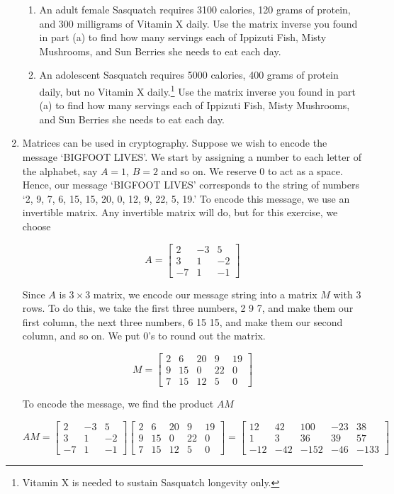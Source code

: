\documentclass{ximera}
\begin{document}
\begin{enumerate}
\begin{enumerate}
\item  An adult female Sasquatch requires 3100 calories, 120 grams of protein, and 300 milligrams of Vitamin X daily. Use the matrix inverse you found in part (a) to find how many servings each of Ippizuti Fish, Misty Mushrooms, and Sun Berries she needs to eat each day.

\item  An adolescent Sasquatch requires 5000 calories, 400 grams of protein daily, but no Vitamin X daily.\footnote{Vitamin X is needed to sustain Sasquatch longevity only.}   Use the matrix inverse you found in part (a) to find how many servings each of Ippizuti Fish, Misty Mushrooms, and Sun Berries she needs to eat each day.

\end{enumerate}


\item Matrices can be used in cryptography.  Suppose we wish to encode the message `BIGFOOT LIVES'.  We start by assigning a number to each letter of the alphabet, say $A=1$, $B=2$ and so on.  We reserve $0$ to act as a space.  Hence, our message `BIGFOOT LIVES' corresponds to the string of numbers `2, 9, 7, 6, 15, 15, 20, 0, 12, 9, 22, 5, 19.' To encode this message, we use an invertible matrix.  Any invertible matrix will do, but for this exercise, we choose

\[ A = \left[ \begin{array}{rrr} 2 & -3 & 5 \\ 3 & 1 &-2 \\ -7 & 1 & -1 \end{array} \right] \]

Since $A$ is  $3 \times 3$ matrix, we encode our message string into a matrix $M$ with $3$ rows.  To do this, we take the first three numbers, 2 9 7, and make them our first column, the next three numbers, 6 15 15, and make them our second column, and so on.  We put $0$'s to round out the matrix.


\[ M = \left[  \begin{array}{rrrrr} 2 & 6 & 20 & 9 & 19 \\ 9 & 15 & 0 & 22 & 0 \\ 7 & 15 & 12 & 5 & 0 \end{array} \right] \]

To encode the message, we find the product $AM$

\[AM =  \left[ \begin{array}{rrr} 2 & -3 & 5 \\ 3 & 1 &-2 \\ -7 & 1 & -1 \end{array} \right]\left[  \begin{array}{rrrrr} 2 & 6 & 20 & 9 & 19 \\ 9 & 15 & 0 & 22 & 0 \\ 7 & 15 & 12 & 5 & 0 \end{array} \right] = \left[  \begin{array}{rrrrr} 12 & 42 & 100 & -23 & 38 \\ 1 & 3 & 36 & 39 & 57 \\ -12 & -42 & -152 & -46 & -133 \end{array} \right]\]


\end{enumerate}
\end{document}
